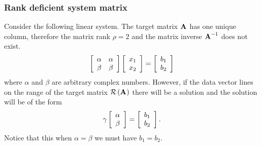 \subsubsection{Rank deficient system matrix}
Consider the following linear system. The target matrix $\A{}$ has one unique column, therefore the matrix rank $\rho = 2$ and the matrix inverse $\A{-1}$ does not exist.
\begin{equation}
  \mat{cc}{\alpha & \alpha \\ \beta & \beta} \mat{c}{x_{1}\\x_{2}} = \mat{c}{b_{1}\\b_{2}}
\end{equation}
where $\alpha$ and $\beta$ are arbitrary complex numbers.
However, if the data vector lines on the range of the target matrix $\rng{\A{}}$ there will be a solution and the solution will be of the form
\begin{equation}
  \gamma \mat{c}{\alpha \\ \beta} = \mat{c}{b_{1}\\b_{2}}.
\end{equation}
Notice that this when $\alpha = \beta$ we must have $b_{1} = b_{2}$.




\endinput